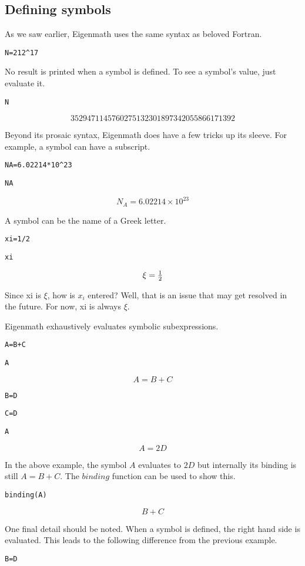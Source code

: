
\subsection{Defining symbols}
As we saw earlier, Eigenmath uses the same syntax as beloved Fortran.

\medskip
\verb$N=212^17$

\medskip
\noindent
No result is printed when a symbol is defined.
To see a symbol's value, just evaluate it.

\medskip
\verb$N$

$$3529471145760275132301897342055866171392$$

\medskip
\noindent
Beyond its prosaic syntax, Eigenmath does have a few tricks up its sleeve.
For example, a symbol can have a subscript.

\medskip
\verb$NA=6.02214*10^23$

\verb$NA$

$$N_A=6.02214\times10^{23}$$

\medskip
\noindent
A symbol can be the name of a Greek letter.

\medskip
\verb$xi=1/2$

\verb$xi$

$$\xi=\hbox{$1\over2$}$$

\medskip
\noindent
Since xi is $\xi$, how is $x_i$ entered?
Well, that is an issue that may get resolved in the future.
For now, xi is always $\xi$.

\medskip
\noindent
Eigenmath exhaustively evaluates symbolic subexpressions.

\medskip
\verb$A=B+C$

\verb$A$

$$A=B+C$$

\verb$B=D$

\verb$C=D$

\verb$A$

$$A=2D$$

\medskip
\noindent
In the above example, the symbol $A$ evaluates to $2D$ but internally its
binding is still $A=B+C$.
The $binding$ function can be used to show this.

\medskip
\verb$binding(A)$

$$B+C$$

\medskip
\noindent
One final detail should be noted.
When a symbol is defined, the right hand side is evaluated.
This leads to the following difference from the previous example.

\medskip
\verb$B=D$

